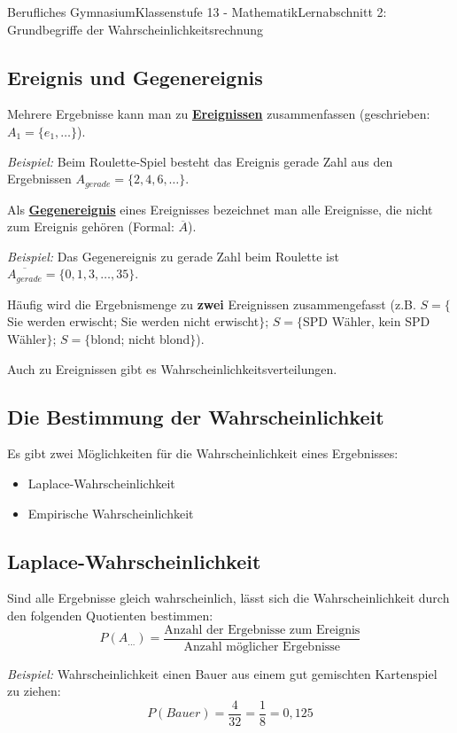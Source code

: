 \documentclass[11pt,twocolumn,oneside,openany,headings=optiontotoc,11pt,numbers=noenddot]{article}
\begin{document}
\begin{worksheet}{Berufliches Gymnasium}{Klassenstufe 13 - Mathematik}{Lernabschnitt 2: Grundbegriffe der Wahrscheinlichkeitsrechnung}
		\subsection{Ereignis und Gegenereignis}
		Mehrere Ergebnisse kann man zu \textbf{\underline{Ereignissen}} zusammenfassen (geschrieben: \(A_1 = \lbrace{}e_1,\ldots\rbrace{}\)).\\
		\par\noindent
		\setlength{\leftskip}{0.5cm}
		\textit{Beispiel:} Beim Roulette-Spiel besteht das Ereignis \glqq{}gerade Zahl\grqq{} aus den Ergebnissen \(A_{gerade} = \lbrace{}2, 4, 6, \ldots\rbrace\).\\
		\par\noindent
		\setlength{\leftskip}{0cm}
		Als \underline{\textbf{Gegenereignis}} eines Ereignisses bezeichnet man alle Ereignisse, die nicht zum Ereignis gehören (Formal: \(\overline{A}\)).\\
		\par
		\setlength{\leftskip}{0.5cm}
		\par\noindent
		\textit{Beispiel:} Das Gegenereignis zu \glqq{}gerade Zahl\grqq{} beim Roulette ist \(\overline{A_{gerade}} = \lbrace{}0,1,3,\ldots,35\rbrace\).\\
		\par
		\setlength{\leftskip}{0cm}
		\par\noindent
		Häufig wird die Ergebnismenge zu \textbf{zwei} Ereignissen zusammengefasst (z.B. \(S = \lbrace\)Sie werden erwischt; Sie werden nicht erwischt\(\rbrace\); \(S = \lbrace\)SPD Wähler, kein SPD Wähler\(\rbrace\); \(S = \lbrace\)blond; nicht blond\(\rbrace\)).\\
		\par\noindent
		Auch zu Ereignissen gibt es Wahrscheinlichkeitsverteilungen.
		\subsection{Die Bestimmung der Wahrscheinlichkeit}
		Es gibt zwei Möglichkeiten für die Wahrscheinlichkeit eines Ergebnisses:
		\begin{itemize}
			\item \glqq{}Laplace\grqq{}-Wahrscheinlichkeit
			\item Empirische Wahrscheinlichkeit
		\end{itemize}
		\subsection{Laplace-Wahrscheinlichkeit}
		Sind alle Ergebnisse gleich wahrscheinlich, lässt sich die Wahrscheinlichkeit durch den folgenden Quotienten bestimmen:
		\[P(A_{\ldots}) = \frac{\text{Anzahl der Ergebnisse zum Ereignis}}{\text{Anzahl möglicher Ergebnisse}}\]
		\par\noindent
		\setlength{\leftskip}{0.5cm}
		\par\noindent
		\textit{Beispiel:} Wahrscheinlichkeit einen Bauer aus einem gut gemischten Kartenspiel zu ziehen:
		\[P(Bauer) = \frac{4}{32} = \frac{1}{8} = 0,125\]
		\par\noindent
		\setlength{\leftskip}{0cm}

\end{worksheet}
\end{document}
